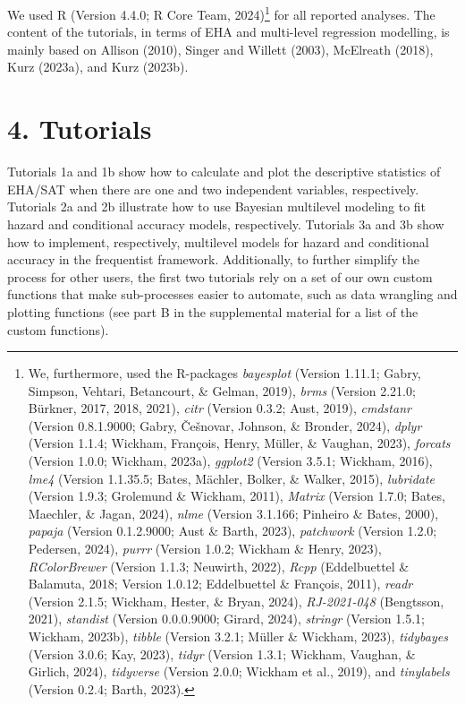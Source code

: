 \documentclass[
  man, donotrepeattitle,floatsintext]{apa6}
\begin{document}
We used R (Version 4.4.0; R Core Team, 2024)\footnote{We, furthermore, used the R-packages \emph{bayesplot} (Version 1.11.1; Gabry, Simpson, Vehtari, Betancourt, \& Gelman, 2019), \emph{brms} (Version 2.21.0; Bürkner, 2017, 2018, 2021), \emph{citr} (Version 0.3.2; Aust, 2019), \emph{cmdstanr} (Version 0.8.1.9000; Gabry, Češnovar, Johnson, \& Bronder, 2024), \emph{dplyr} (Version 1.1.4; Wickham, François, Henry, Müller, \& Vaughan, 2023), \emph{forcats} (Version 1.0.0; Wickham, 2023a), \emph{ggplot2} (Version 3.5.1; Wickham, 2016), \emph{lme4} (Version 1.1.35.5; Bates, Mächler, Bolker, \& Walker, 2015), \emph{lubridate} (Version 1.9.3; Grolemund \& Wickham, 2011), \emph{Matrix} (Version 1.7.0; Bates, Maechler, \& Jagan, 2024), \emph{nlme} (Version 3.1.166; Pinheiro \& Bates, 2000), \emph{papaja} (Version 0.1.2.9000; Aust \& Barth, 2023), \emph{patchwork} (Version 1.2.0; Pedersen, 2024), \emph{purrr} (Version 1.0.2; Wickham \& Henry, 2023), \emph{RColorBrewer} (Version 1.1.3; Neuwirth, 2022), \emph{Rcpp} (Eddelbuettel \& Balamuta, 2018; Version 1.0.12; Eddelbuettel \& François, 2011), \emph{readr} (Version 2.1.5; Wickham, Hester, \& Bryan, 2024), \emph{RJ-2021-048} (Bengtsson, 2021), \emph{standist} (Version 0.0.0.9000; Girard, 2024), \emph{stringr} (Version 1.5.1; Wickham, 2023b), \emph{tibble} (Version 3.2.1; Müller \& Wickham, 2023), \emph{tidybayes} (Version 3.0.6; Kay, 2023), \emph{tidyr} (Version 1.3.1; Wickham, Vaughan, \& Girlich, 2024), \emph{tidyverse} (Version 2.0.0; Wickham et al., 2019), and \emph{tinylabels} (Version 0.2.4; Barth, 2023).} for all reported analyses. The content of the tutorials, in terms of EHA and multi-level regression modelling, is mainly based on Allison (2010), Singer and Willett (2003), McElreath (2018), Kurz (2023a), and Kurz (2023b).

\section{4. Tutorials}\label{tutorials}

Tutorials 1a and 1b show how to calculate and plot the descriptive statistics of EHA/SAT when there are one and two independent variables, respectively. Tutorials 2a and 2b illustrate how to use Bayesian multilevel modeling to fit hazard and conditional accuracy models, respectively. Tutorials 3a and 3b show how to implement, respectively, multilevel models for hazard and conditional accuracy in the frequentist framework.
Additionally, to further simplify the process for other users, the first two tutorials rely on a set of our own custom functions that make sub-processes easier to automate, such as data wrangling and plotting functions (see part B in the supplemental material for a list of the custom functions).
\end{document}
